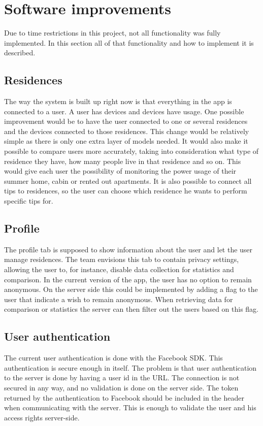 \section{Software improvements}
Due to time restrictions in this project, not all functionality was fully implemented. In this section all of that functionality and how to implement it is described. 

\subsection{Residences}
The way the system is built up right now is that everything in the app is connected to a user. A user has devices and devices have usage. One possible improvement would be to have the user connected to one or several residences and the devices connected to those residences. This change would be relatively simple as there is only one extra layer of models needed. It would also make it possible to compare users more accurately, taking into consideration what type of residence they have, how many people live in that residence and so on. This would give each user the possibility of monitoring the power usage of their summer home, cabin or rented out apartments. It is also possible to connect all tips to residences, so the user can choose which residence he wants to perform specific tips for. 

\subsection{Profile}
The profile tab is supposed to show information about the user and let the user manage residences. The team envisions this tab to contain privacy settings, allowing the user to, for instance, disable data collection for statistics and comparison. In the current version of the app, the user has no option to remain anonymous. 
On the server side this could be implemented by adding a flag to the user that indicate a wish to remain anonymous. When retrieving data for comparison or statistics the server can then filter out the users based on this flag.

\subsection{User authentication}
The current user authentication is done with the Facebook SDK. This authentication is secure enough in itself. 
The problem is that user authentication to the server is done by having a user id in the URL. The connection is not secured in any way, and no validation is done on the server side.
The token returned by the authentication to Facebook should be included in the header when communicating with the server. This is enough to validate the user and his access rights server-side.

